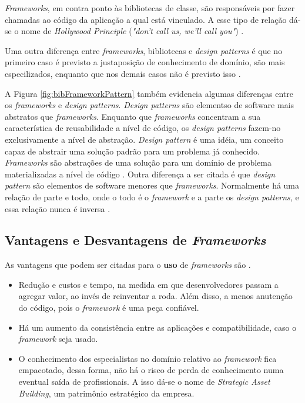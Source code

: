 \par
\indent \textit{Frameworks}, em contra ponto às bibliotecas de classe, são responsáveis por fazer chamadas ao código da aplicação a qual está vinculado. A esse tipo de relação dá-se o nome de \textit{Hollywood Principle} (\textit{"don't call us, we'll call you"}) \cite{sauve2006}.
\par
\indent Uma outra diferença entre \textit{frameworks}, bibliotecas e \textit{design patterns} é que no  primeiro caso é previsto a justaposição de conhecimento de domínio, são mais especilizados, enquanto que nos demais casos não é previsto isso \cite{sauve2006}.
\par
\indent A Figura \ref{fig:bibFrameworkPattern} também evidencia algumas diferenças entre os \textit{frameworks} e \textit{design patterns}. \textit{Design patterns} são elementso de software mais abstratos que \textit{frameworks}. Enquanto que \textit{frameworks} concentram a sua característica de reusabilidade a nível de código, os \textit{design patterns} fazem-no exclusivamente a nível de abstração. \textit{Design pattern} é uma idéia, um conceito capaz de abstrair uma solução padrão para um problema já conhecido. \textit{Frameworks} são abstrações de uma solução para um domínio de problema materializadas a nível de código \cite{sauve2006}. Outra diferença a ser citada é que \textit{design pattern} são elementos de software menores que \textit{frameworks}. Normalmente há uma relação de parte e todo, onde o todo é o \textit{framework} e a parte os \textit{design patterns}, e essa relação nunca é inversa \cite{sauve2006}.

\subsection{Vantagens e Desvantagens de \textit{Frameworks}}
As vantagens que podem ser citadas para o \textbf{uso} de \textit{frameworks} são \cite{barretoJunior2006} \cite{sauve2006}.
\begin{itemize}
\item Redução e custos e tempo, na medida em que desenvolvedores passam a agregar valor, ao invés de reinventar a roda. Além disso, a menos anutenção do código, pois o \textit{framework} é uma peça confiável.
\item Há um aumento da consistência entre as aplicações e compatibilidade, caso o \textit{framework} seja usado.
\item O conhecimento dos especialistas no domínio relativo ao \textit{framework} fica empacotado, dessa forma, não há o risco de perda de conhecimento numa eventual saída de profissionais. A isso dá-se o nome de \textit{Strategic Asset Building}, um patrimônio estratégico da empresa.
\end{itemize}

